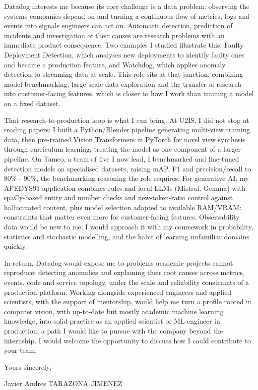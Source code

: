 \documentclass[11pt,a4paper]{article}
\begin{document}
Datadog interests me because its core challenge is a data problem: observing the systems companies depend on and turning a continuous flow of metrics, logs and events into signals engineers can act on. Automatic detection, prediction of incidents and investigation of their causes are research problems with an immediate product consequence. Two examples I studied illustrate this: Faulty Deployment Detection, which analyses new deployments to identify faulty ones and became a production feature, and Watchdog, which applies anomaly detection to streaming data at scale. This role sits at that junction, combining model benchmarking, large-scale data exploration and the transfer of research into customer-facing features, which is closer to how I work than training a model on a fixed dataset.

That research-to-production loop is what I can bring. At U2IS, I did not stop at reading papers: I built a Python/Blender pipeline generating multi-view training data, then pre-trained Vision Transformers in PyTorch for novel view synthesis through curriculum learning, treating the model as one component of a larger pipeline. On Tameo, a team of five I now lead, I benchmarked and fine-tuned detection models on specialised datasets, raising mAP, F1 and precision/recall to 80\% - 90\%, the benchmarking reasoning the role requires. For generative AI, my APEDYS91 application combines rules and local LLMs (Mistral, Gemma) with spaCy-based entity and number checks and new-token-ratio control against hallucinated content, plus model selection adapted to available RAM/VRAM: constraints that matter even more for customer-facing features. Observability data would be new to me; I would approach it with my coursework in probability, statistics and stochastic modelling, and the habit of learning unfamiliar domains quickly.

In return, Datadog would expose me to problems academic projects cannot reproduce: detecting anomalies and explaining their root causes across metrics, events, code and service topology, under the scale and reliability constraints of a production platform. Working alongside experienced engineers and applied scientists, with the support of mentorship, would help me turn a profile rooted in computer vision, with up-to-date but mostly academic machine learning knowledge, into solid practice as an applied scientist or ML engineer in production, a path I would like to pursue with the company beyond the internship. I would welcome the opportunity to discuss how I could contribute to your team.

Yours sincerely,

\vspace{0.2cm}

Javier Andres TARAZONA JIMENEZ
\end{document}
